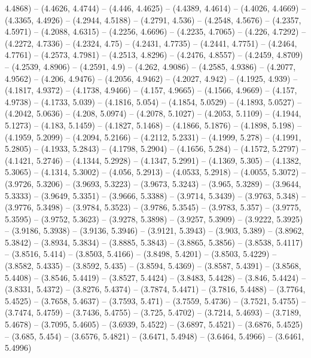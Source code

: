 {  4.4868) -- (4.4626, 4.4744) -- (4.446, 4.4625) -- (4.4389, 4.4614) -- (4.4026,
   4.4669) -- (4.3365, 4.4926) -- (4.2944, 4.5188) -- (4.2791, 4.536) -- 
  (4.2548, 4.5676) -- (4.2357, 4.5971) -- (4.2088, 4.6315) -- (4.2256, 4.6696) 
  -- (4.2235, 4.7065) -- (4.226, 4.7292) -- (4.2272, 4.7336) -- (4.2324, 4.75) 
  -- (4.2431, 4.7735) -- (4.2441, 4.7751) -- (4.2464, 4.7761) -- (4.2573, 
  4.7981) -- (4.2513, 4.8296) -- (4.2476, 4.8557) -- (4.2459, 4.8709) -- 
  (4.2539, 4.8906) -- (4.2591, 4.9) -- (4.262, 4.9086) -- (4.2585, 4.9386) -- 
  (4.2077, 4.9562) -- (4.206, 4.9476) -- (4.2056, 4.9462) -- (4.2027, 4.942) -- 
  (4.1925, 4.939) -- (4.1817, 4.9372) -- (4.1738, 4.9466) -- (4.157, 4.9665) -- 
  (4.1566, 4.9669) -- (4.157, 4.9738) -- (4.1733, 5.039) -- (4.1816, 5.054) -- 
  (4.1854, 5.0529) -- (4.1893, 5.0527) -- (4.2042, 5.0636) -- (4.208, 5.0974) --
   (4.2078, 5.1027) -- (4.2053, 5.1109) -- (4.1944, 5.1273) -- (4.183, 5.1459) 
  -- (4.1827, 5.1468) -- (4.1866, 5.1876) -- (4.1898, 5.198) -- (4.1959, 5.2099)
   -- (4.2094, 5.2166) -- (4.2112, 5.2331) -- (4.1999, 5.278) -- (4.1991, 
  5.2805) -- (4.1933, 5.2843) -- (4.1798, 5.2904) -- (4.1656, 5.284) -- (4.1572,
   5.2797) -- (4.1421, 5.2746) -- (4.1344, 5.2928) -- (4.1347, 5.2991) -- 
  (4.1369, 5.305) -- (4.1382, 5.3065) -- (4.1314, 5.3002) -- (4.056, 5.2913) -- 
  (4.0533, 5.2918) -- (4.0055, 5.3072) -- (3.9726, 5.3206) -- (3.9693, 5.3223) 
  -- (3.9673, 5.3243) -- (3.965, 5.3289) -- (3.9644, 5.3333) -- (3.9649, 5.3351)
   -- (3.9666, 5.3388) -- (3.9714, 5.3439) -- (3.9763, 5.348) -- (3.9776, 
  5.3498) -- (3.9784, 5.3523) -- (3.9786, 5.3545) -- (3.9783, 5.357) -- (3.9775,
   5.3595) -- (3.9752, 5.3623) -- (3.9278, 5.3898) -- (3.9257, 5.3909) -- 
  (3.9222, 5.3925) -- (3.9186, 5.3938) -- (3.9136, 5.3946) -- (3.9121, 5.3943) 
  -- (3.903, 5.389) -- (3.8962, 5.3842) -- (3.8934, 5.3834) -- (3.8885, 5.3843) 
  -- (3.8865, 5.3856) -- (3.8538, 5.4117) -- (3.8516, 5.414) -- (3.8503, 5.4166)
   -- (3.8498, 5.4201) -- (3.8503, 5.4229) -- (3.8582, 5.4335) -- (3.8592, 
  5.435) -- (3.8594, 5.4369) -- (3.8587, 5.4391) -- (3.8568, 5.4408) -- (3.8546,
   5.4419) -- (3.8527, 5.4424) -- (3.8483, 5.4428) -- (3.846, 5.4424) -- 
  (3.8331, 5.4372) -- (3.8276, 5.4374) -- (3.7874, 5.4471) -- (3.7816, 5.4488) 
  -- (3.7764, 5.4525) -- (3.7658, 5.4637) -- (3.7593, 5.471) -- (3.7559, 5.4736)
   -- (3.7521, 5.4755) -- (3.7474, 5.4759) -- (3.7436, 5.4755) -- (3.725, 
  5.4702) -- (3.7214, 5.4693) -- (3.7189, 5.4678) -- (3.7095, 5.4605) -- 
  (3.6939, 5.4522) -- (3.6897, 5.4521) -- (3.6876, 5.4525) -- (3.685, 5.454) -- 
  (3.6576, 5.4821) -- (3.6471, 5.4948) -- (3.6464, 5.4966) -- (3.6461, 5.4996) 
}
